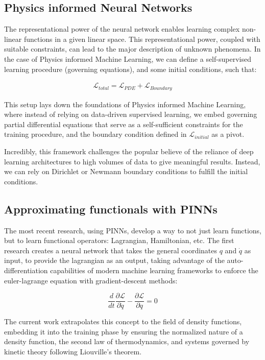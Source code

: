 \documentclass[12pt]{article}
\begin{document}
\subsection{Physics informed Neural Networks}
The representational power of the neural network enables learning complex non-linear functions in a given linear space. This representational power, coupled with suitable constraints, can lead to the major description of unknown phenomena. In the case of Physics informed Machine Learning, we can define a self-supervised learning procedure (governing equations), and some initial conditions, such that:

\begin{align*}
    \mathcal{L}_{total} = \mathcal{L}_{PDE} + \mathcal{L}_{Boundary}
\end{align*}

This setup lays down the foundations of Physics informed Machine Learning, where instead of relying on data-driven supervised learning, we embed governing partial differential equations that serve as a self-sufficient constraints for the training procedure, and the boundary condition defined in $\mathcal{L}_{initial}$ as a pivot.

Incredibly, this framework challenges the popular believe of the reliance of deep learning architectures to high volumes of data to give meaningful results. Instead, we can rely on Dirichlet or Newmann boundary conditions to fulfill the initial conditions.

\subsection{Approximating functionals with PINNs}
The most recent research, using PINNs, develop a way to not just learn functions, but to learn functional operators: Lagrangian, Hamiltonian, etc. \cite{cranmer2020lagrangianneuralnetworks, greydanus2019hamiltonianneuralnetworks} The first research creates a neural network that takes the general coordinates $q$ and $\dot q$ as input, to provide the lagrangian as an output, taking advantage of the auto-differentiation capabilities of modern machine learning frameworks to enforce the euler-lagrange equation with gradient-descent methods:

\begin{equation}
    \frac{d}{dt} \frac{\partial \mathcal{L}}{\partial \dot q} - \frac{\partial \mathcal{L}}{\partial q} = 0
\end{equation}

The current work extrapolates this concept to the field of density functions, embedding it into the training phase by ensuring the normalized nature of a density function, the second law of thermodynamics, and systems governed by kinetic theory following Liouville's theorem.
\end{document}
